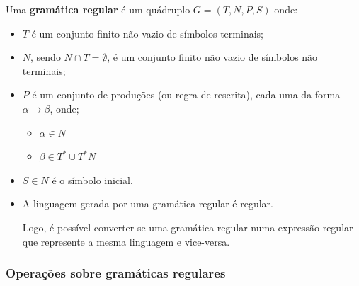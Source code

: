 \documentclass{article}
\begin{document}
\begin{flushleft}
  \item Uma \textbf{gramática regular} é um quádruplo $G = (T, N, P, S)$ onde:
  \begin{itemize}
    \item $T$ é um conjunto finito não vazio de símbolos terminais;
    \item $N$, sendo $N \cap T = \emptyset$, é um conjunto finito não vazio de símbolos não terminais;
    \item $P$ é um conjunto de produções (ou regra de rescrita), cada uma da forma $\alpha \rightarrow \beta$, onde;
    \begin{itemize}
      \item $\alpha \in N$
      \item $\beta \in T^* \cup T^* N$
    \end{itemize}
    \item $S \in N$ é o símbolo inicial.
  \end{itemize}

  \begin{itemize}
    \item A linguagem gerada por uma gramática regular  é regular.
    
    Logo, é possível converter-se uma gramática regular numa expressão regular que
    represente a mesma linguagem e vice-versa.
  \end{itemize}
\end{flushleft}

\subsubsection{Operações sobre gramáticas regulares}
\end{document}
